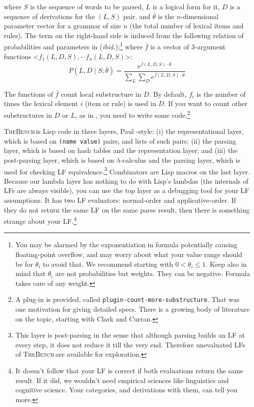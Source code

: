 \documentclass[11pt]{article}
\newcommand{\tool}{\textsc{TheBench}}
\begin{document}
\noindent where $S$ is the sequence of words to be parsed, $L$ is a logical form for it, $D$ is a sequence of  derivations for the $(L,S)$ pair, and $\bar{\theta}$
is the $n$-dimensional parameter vector for a grammar of size $n$ (the total number of lexical items and rules).
The term on the right-hand side is induced from the following relation of probabilities and parameters in  
(\emph{ibid.});\footnote{You may be alarmed by the exponentiation in formula potentially causing floating-point
overflow, and may worry about what your value range should be for ${\theta}_i$ to avoid that. 
We recommend starting with $0<\theta_i\le 1$. Keep also in mind that $\theta_i$ are not probabilities but weights.
They can be negative. Formula takes care of any weight.
}
 where $\bar{f}$ is a vector of 3-argument functions <${f}_1(L,D,S),\cdots {f}_n(L,D,S)$>:
\begin{equation}
\label{rul:prob}
 P(L,D\mid S;\bar{\theta}) = {\displaystyle\dfrac{e^{\bar{f}(L, D, S)\cdot\bar{\theta}}}
{\sum\limits_{L}\sum\limits_{D} e^{\bar{f}(L, D, S)\cdot\bar{\theta}}}}
\end{equation}

 
\noindent The functions of $\bar{f}$ count local substructure in $D$. By default, ${f}_i$ is the number of times the lexical element   $i$ (item or rule) is used in $D$. If you want to count other substructures in $D$  or $L$, as in \cite{clar:03}, you need to write some code.\footnote{A plug-in is provided, called \verb+plugin-count-more-substructure+.
That was one motivation for giving detailed specs. There is a growing body of literature on the topic, starting with
Clark and Curran.}

\tool\,is Lisp code in three layers, Paul \citealt{grah:94}-style: (i) the representational layer, which is based on \verb|(name value)| pairs, and lists of such pairs; (ii) the parsing layer, which is based on hash tables and the representation layer; and (iii) the post-parsing layer, which is based
on $\lambda$-calculus and the parsing layer, which is used for checking LF equivalence.\footnote{This layer
is post-parsing in the sense that although parsing builds an LF at every step, it does not reduce it till the very end. Therefore
unevaluated LFs of \tool\,are available for exploration.}
Combinators are Lisp macros on the last layer.
Because our lambda layer has nothing to do with Lisp's lambdas (the internals of LFs are always visible), you can use the top layer as a debugging tool for your LF assumptions. It has two LF evaluators: normal-order and applicative-order.
If they do not return the same LF on the same parse result, then there is something strange about your LF.\footnote{It doesn't
follow that your LF is correct if both evaluations return the same result. If it did, we wouldn't need  empirical sciences
like linguistics and cognitive science.
Your categories, and derivations with them,
can tell you more.}
\end{document}
